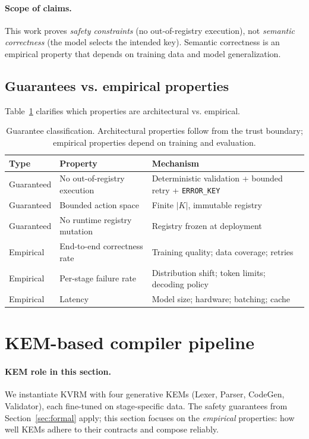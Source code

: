 \documentclass[11pt]{article}
\begin{document}
\paragraph{Scope of claims.}
This work proves \emph{safety constraints} (no out-of-registry execution), not \emph{semantic correctness} (the model selects the intended key). Semantic correctness is an empirical property that depends on training data and model generalization.

\subsection{Guarantees vs. empirical properties}
Table~\ref{tab:guarantees} clarifies which properties are architectural vs. empirical.

\begin{table}[h]
\centering
\caption{Guarantee classification. Architectural properties follow from the trust boundary; empirical properties depend on training and evaluation.}
\label{tab:guarantees}
\begin{tabular}{llp{7.1cm}}
\toprule
Type & Property & Mechanism \\
\midrule
Guaranteed & No out-of-registry execution & Deterministic validation + bounded retry + \texttt{ERROR\_KEY} \\
Guaranteed & Bounded action space & Finite $|K|$, immutable registry \\
Guaranteed & No runtime registry mutation & Registry frozen at deployment \\
\midrule
Empirical & End-to-end correctness rate & Training quality; data coverage; retries \\
Empirical & Per-stage failure rate & Distribution shift; token limits; decoding policy \\
Empirical & Latency & Model size; hardware; batching; cache \\
\bottomrule
\end{tabular}
\end{table}

\section{KEM-based compiler pipeline}\label{sec:compiler}

\paragraph{KEM role in this section.}
We instantiate KVRM with four generative KEMs (Lexer, Parser, CodeGen, Validator), each fine-tuned on stage-specific data. The safety guarantees from Section~\ref{sec:formal} apply; this section focuses on the \emph{empirical} properties: how well KEMs adhere to their contracts and compose reliably.
\end{document}
